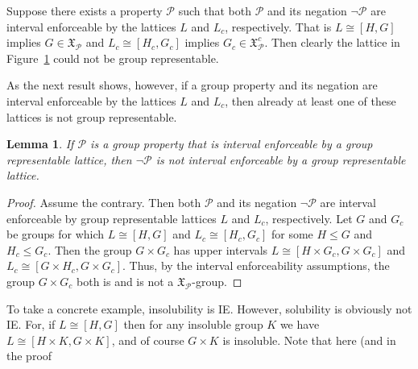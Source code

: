 \documentclass[11pt]{amsart}
\theoremstyle{plain}
\newtheorem{lemma}[theorem]{Lemma}
\theoremstyle{definition}
\theoremstyle{remark}
\numberwithin{theorem}{section}
\numberwithin{claim}{section}
\numberwithin{equation}{section}
\numberwithin{conjecture}{section}
\newcommand{\<}{\ensuremath{\langle}}
\renewcommand{\>}{\ensuremath{\rangle}}
\renewcommand{\leq}{\ensuremath{\leqslant}}
\newcommand{\0}{\ensuremath{\mathbf{0}}}
\newcommand{\1}{\ensuremath{\mathbf{1}}}
\newcommand{\2}{\ensuremath{\mathbf{2}}}
\newcommand{\3}{\ensuremath{\mathbf{3}}}
\newcommand{\4}{\ensuremath{\mathbf{4}}}
\newcommand{\5}{\ensuremath{\mathbf{5}}}
\newcommand{\sG}{\ensuremath{\mathfrak{X}}}
\newcommand{\cP}{\ensuremath{\mathcal{P}}}
\newcommand{\IE}{{\small IE}}
\begin{document}
Suppose there exists a property $\cP$ such that both $\cP$ and
its negation $\neg \cP$ are interval enforceable by the lattices $L$ and $L_c$,
respectively.  That is $L\cong [H,G]$ implies $G \in \sG_\cP$ and 
$L_c\cong [H_c,G_c]$ implies $G_c\in \sG_\cP^c$.  Then clearly the
lattice in Figure~\ref{fig:twopanelchute} could not be group representable.  
\begin{figure}[!h]
  \centering
{}
\caption{}
\label{fig:twopanelchute}  
\end{figure}
As the next result shows, however, if a group property and its
negation are interval enforceable by the lattices $L$ and $L_c$, then already
at least one of these lattices is not group representable.
\begin{lemma}
\label{lemma:ie-prop-and-neg}
  If $\cP$ is a group property that is interval enforceable by a group representable lattice,
  then $\neg \cP$ is not interval enforceable by a group representable lattice.
\end{lemma}
\begin{proof}
Assume the contrary.  Then both $\cP$ and its negation $\neg \cP$
are interval enforceable by group representable lattices $L$ and $L_c$,
respectively. Let $G$ and $G_c$ be groups for which $L\cong [H,G]$ and $L_c\cong
[H_c,G_c]$ for some $H\leq G$ and $H_c\leq G_c$.
Then the group $G\times G_c$ has upper intervals 
$L\cong [H\times G_c, G\times G_c]$ and 
$L_c\cong [G\times H_c, G\times G_c]$.  Thus, by the interval enforceability
assumptions, the group $G\times G_c$ both is and is not a $\sG_\cP$-group. 
\end{proof}
To take a concrete example, insolubility is \IE.  However, solubility is
obviously not \IE. For, if $L\cong [H, G]$ then for any insoluble 
group $K$ we have $L\cong [H\times K, G\times K]$, and of course $G\times K$ is
insoluble.  Note that here (and in the proof 
\end{document}
